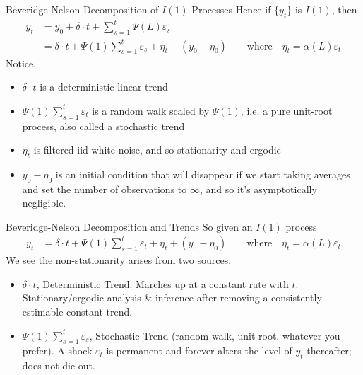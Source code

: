 \documentclass[aspectratio=169, handout]{beamer}
\begin{document}
{\footnotesize
\begin{frame}{Beveridge-Nelson Decomposition of $I(1)$ Processes}
Hence if $\{y_t\}$ is $I(1)$, then
\begin{align*}
  y_t
  &= y_0 + \delta \cdot t + \sum_{s=1}^t \Psi(L)\varepsilon_s
  \\
  &=
  \delta \cdot t
  +
  \Psi(1)
  \sum_{s=1}^t
  \varepsilon_s
  +
  \eta_t
  +
  (y_0-\eta_0)
  \qquad \text{where}\quad
  \eta_t
  =
  \alpha(L)
  \varepsilon_t
\end{align*}
\pause
Notice,
\begin{itemize}
  \item $\delta\cdot t$ is a \alert{deterministic linear trend}
  \pause
  \item $\Psi(1)\sum_{s=1}^t \varepsilon_t$ is a \alert{random walk}
    scaled by $\Psi(1)$, i.e. a pure unit-root process, also called a
    \alert{stochastic trend}
  \pause
  \item $\eta_t$ is filtered iid white-noise, and so
    stationarity and ergodic
  \pause
  \item $y_0-\eta_0$ is an initial condition that will disappear if we
    start taking averages and set the number of observations to
    $\infty$, and so it's asymptotically negligible.
\end{itemize}
\end{frame}
}

{\scriptsize
\begin{frame}{Beveridge-Nelson Decomposition and Trends}
So given an $I(1)$ process
\begin{align*}
  y_t
  &=
  \delta \cdot t
  +
  \Psi(1)
  \sum_{s=1}^t
  \varepsilon_t
  +
  \eta_t
  +
  (y_0-\eta_0)
  \qquad\text{where}\quad
  \eta_t
  =
  \alpha(L)
  \varepsilon_t
\end{align*}
We see the non-stationarity arises from two sources:
\begin{itemize}
  \pause
  \item $\delta\cdot t$, \alert{Deterministic Trend}:
    Marches up at a constant rate with $t$.
    Stationary/ergodic analysis \& inference after
    removing a consistently estimable constant trend.

  \pause
  \item $\Psi(1)\sum_{s=1}^t\varepsilon_s$, \alert{Stochastic Trend}
    (random walk, unit root, whatever you prefer).
    A shock $\varepsilon_t$ is \alert{permanent} and forever alters the
    level of $y_t$ thereafter; does not die out.
\end{itemize}
\end{frame}
}
\end{document}
